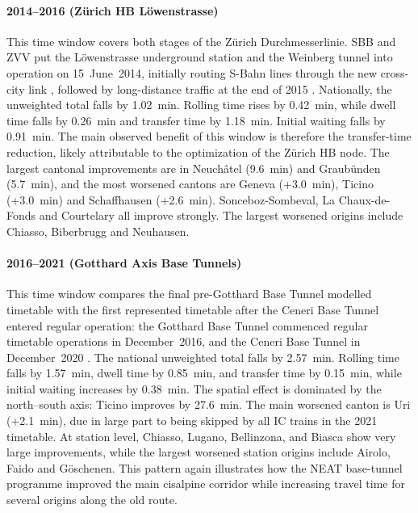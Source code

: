 \documentclass[preprint,12pt]{elsarticle}
\begin{document}
\paragraph{2014--2016 (Zürich HB Löwenstrasse)}
This time window covers both stages of the Zürich Durchmesserlinie. SBB and ZVV put the Löwenstrasse underground station and the Weinberg tunnel into operation on 15~June~2014, initially routing S-Bahn lines through the new cross-city link \citep{sbbZuerichDml2014TimetableChange}, followed by long-distance traffic at the end of 2015 \citep{zvvDurchmesserlinieProject}. Nationally, the unweighted total falls by 1.02~min. Rolling time rises by 0.42~min, while dwell time falls by 0.26~min and transfer time by 1.18~min. Initial waiting falls by 0.91~min. The main observed benefit of this window is therefore the transfer-time reduction, likely attributable to the optimization of the Zürich HB node. The largest cantonal improvements are in Neuchâtel (9.6~min) and Graubünden (5.7~min), and the most worsened cantons are Geneva (+3.0~min), Ticino (+3.0~min) and Schaffhausen (+2.6~min). Sonceboz-Sombeval, La Chaux-de-Fonds and Courtelary all improve strongly. The largest worsened origins include Chiasso, Biberbrugg and Neuhausen.

\paragraph{2016--2021 (Gotthard Axis Base Tunnels)}
This time window compares the final pre-Gotthard Base Tunnel modelled timetable with the first represented timetable after the Ceneri Base Tunnel entered regular operation: the Gotthard Base Tunnel commenced regular timetable operations in December~2016, and the Ceneri Base Tunnel in December~2020 \citep{edaGotthardOpening2016,railwayNewsCeneri2020}. The national unweighted total falls by 2.57~min. Rolling time falls by 1.57~min, dwell time by 0.85~min, and transfer time by 0.15~min, while initial waiting increases by 0.38~min. The spatial effect is dominated by the north--south axis: Ticino improves by 27.6~min. The main worsened canton is Uri (+2.1~min), due in large part to being skipped by all IC trains in the 2021 timetable. At station level, Chiasso, Lugano, Bellinzona, and Biasca show very large improvements, while the largest worsened station origins include Airolo, Faido and Göschenen. This pattern again illustrates how the NEAT base-tunnel programme improved the main cisalpine corridor while increasing travel time for several origins along the old route.
\end{document}
